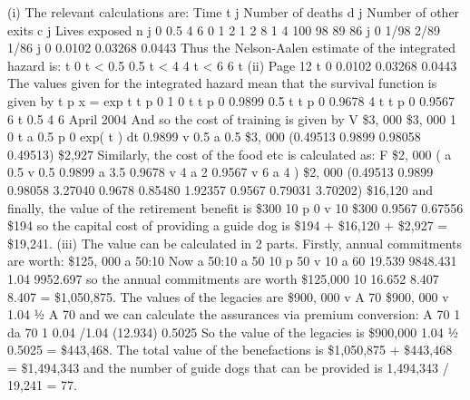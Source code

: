 \documentclass[a4paper,12pt]{article}
\begin{document}
(i)
The relevant calculations are:
Time
t j Number of
deaths
d j Number of
other exits
c j Lives
exposed
n j
0
0.5
4
6 0
1
2
1 2
8
1
4 100
98
89
86
j
0
1/98
2/89
1/86
j
0
0.0102
0.03268
0.0443
Thus the Nelson-Aalen estimate of the integrated hazard is:
t
0 t < 0.5
0.5 t < 4
4 t < 6
6 t
(ii)
Page 12
t
0
0.0102
0.03268
0.0443
The values given for the integrated hazard mean that the survival function is
given by t p x = exp{ t }
t p 0 1 0 t
t p 0 0.9899 0.5 t
t p 0 0.9678 4 t
t p 0 0.9567 6 t
0.5
4
6 %
April 2004
And so the cost of training is given by
V
\$3, 000
\$3, 000
1
0 t
a 0.5
p 0 exp(
t ) dt
0.9899 v 0.5 a 0.5
\$3, 000 (0.49513 0.9899 0.98058 0.49513)
\$2,927
Similarly, the cost of the food etc is calculated as:
F \$2, 000 ( a 0.5 v 0.5 0.9899 a 3.5 0.9678 v 4 a 2
0.9567 v 6 a 4 )
\$2, 000 (0.49513 0.9899 0.98058 3.27040 0.9678 0.85480
1.92357 0.9567 0.79031 3.70202)
\$16,120
and finally, the value of the retirement benefit is
\$300 10 p 0 v 10 \$300 0.9567 0.67556 \$194
so the capital cost of providing a guide dog is
\$194 + \$16,120 + \$2,927 = \$19,241.
(iii)
The value can be calculated in 2 parts. Firstly, annual commitments are
worth:
\$125, 000 a 50:10
Now a 50:10
a 50
10
p 50 v 10 a 60 19.539
9848.431
1.04
9952.697
so the annual commitments are worth \$125,000
10
16.652 8.407
8.407 = \$1,050,875.
The values of the legacies are
\$900, 000 v A 70 \$900, 000 v 1.04 1⁄2 A 70
and we can calculate the assurances via premium conversion:
A 70 1 da 70 1 0.04 /1.04 (12.934) 0.5025
So the value of the legacies is \$900,000
1.04
1⁄2
0.5025 = \$443,468.
The total value of the benefactions is
\$1,050,875 + \$443,468 = \$1,494,343
and the number of guide dogs that can be provided is
1,494,343 / 19,241 = 77.
\end{document}
